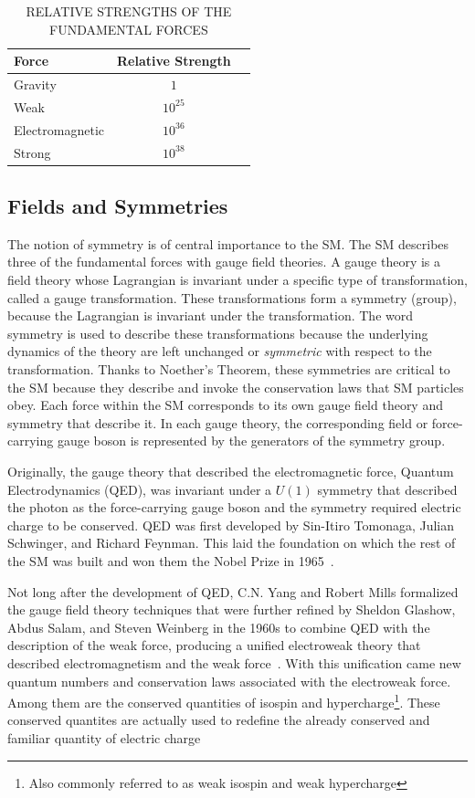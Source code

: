 \begin{table}[hbtp]
\centering
\caption[RELATIVE STRENGTHS OF THE FUNDAMENTAL FORCES]{RELATIVE STRENGTHS OF THE FUNDAMENTAL FORCES}
\begin{tabular}{lcc}
\hline
Force & Relative Strength \\
\hline
Gravity & $1$ \\
Weak &  $10^{25}$ \\
Electromagnetic & $10^{36}$ \\
Strong & $10^{38}$ \\
\hline
\end{tabular}
\label{tab:force_table}
\end{table}


\subsection{Fields and Symmetries}
The notion of symmetry is of central importance to the SM.
The SM describes three of the fundamental forces with gauge field theories.
A gauge theory is a field theory whose Lagrangian is invariant under a specific type
of transformation, called a gauge transformation. These transformations form a symmetry (group), because the Lagrangian is invariant under the transformation.
The word symmetry is used to describe these transformations because
the underlying dynamics of the theory are left unchanged or \emph{symmetric} with respect to the transformation.
Thanks to Noether's Theorem, these symmetries are critical to the SM because they describe and invoke the conservation laws that SM particles obey.
Each force within the SM corresponds to its own gauge field theory
and symmetry that describe it. In each gauge theory, the corresponding field or force-carrying gauge boson is represented by the generators of the symmetry group. 

Originally, the gauge theory that described the electromagnetic force, Quantum Electrodynamics (QED), was invariant under a $U(1)$ symmetry that described the photon as the
force-carrying gauge boson and the symmetry required electric charge to be conserved. QED was first developed by Sin-Itiro Tomonaga, Julian Schwinger, and Richard Feynman.
This laid the foundation on which the rest of the SM was built and won them the Nobel Prize in 1965~\cite{NP65}. 

Not long after the development of QED, C.N. Yang and Robert Mills formalized the gauge field theory techniques that were further refined by Sheldon Glashow, Abdus Salam,
and Steven Weinberg in the 1960s to combine QED
with the description of the weak force, producing a unified electroweak theory that described electromagnetism and the weak force~\cite{NP79}.
With this unification came new quantum numbers and conservation laws associated with the electroweak force. Among them are the conserved quantities of isospin and hypercharge\footnote{Also commonly
referred to as weak isospin and weak hypercharge}. These conserved quantites are actually used to redefine the already conserved and familiar quantity of electric charge

